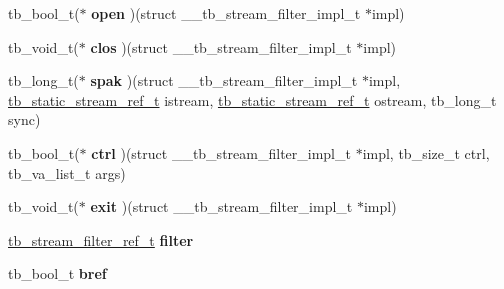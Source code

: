 \begin{DoxyCompactItemize}
\item 
\hypertarget{structtb__stream__filter__impl__t_a34126d14efef5a634b870b4b558e9148}{tb\-\_\-bool\-\_\-t($\ast$ {\bfseries open} )(struct \-\_\-\-\_\-tb\-\_\-stream\-\_\-filter\-\_\-impl\-\_\-t $\ast$impl)}\label{structtb__stream__filter__impl__t_a34126d14efef5a634b870b4b558e9148}

\item 
\hypertarget{structtb__stream__filter__impl__t_a291ebabbf406142133bd3030c4bd5521}{tb\-\_\-void\-\_\-t($\ast$ {\bfseries clos} )(struct \-\_\-\-\_\-tb\-\_\-stream\-\_\-filter\-\_\-impl\-\_\-t $\ast$impl)}\label{structtb__stream__filter__impl__t_a291ebabbf406142133bd3030c4bd5521}

\item 
\hypertarget{structtb__stream__filter__impl__t_a147adaedf1b51d9bc2f5eed1e52ae001}{tb\-\_\-long\-\_\-t($\ast$ {\bfseries spak} )(struct \-\_\-\-\_\-tb\-\_\-stream\-\_\-filter\-\_\-impl\-\_\-t $\ast$impl, \hyperlink{static__stream_8h_a6f19ed215d23e2708f134474b87d281a}{tb\-\_\-static\-\_\-stream\-\_\-ref\-\_\-t} istream, \hyperlink{static__stream_8h_a6f19ed215d23e2708f134474b87d281a}{tb\-\_\-static\-\_\-stream\-\_\-ref\-\_\-t} ostream, tb\-\_\-long\-\_\-t sync)}\label{structtb__stream__filter__impl__t_a147adaedf1b51d9bc2f5eed1e52ae001}

\item 
\hypertarget{structtb__stream__filter__impl__t_a9e67f6392c8bbe7594dc18daac2be254}{tb\-\_\-bool\-\_\-t($\ast$ {\bfseries ctrl} )(struct \-\_\-\-\_\-tb\-\_\-stream\-\_\-filter\-\_\-impl\-\_\-t $\ast$impl, tb\-\_\-size\-\_\-t ctrl, tb\-\_\-va\-\_\-list\-\_\-t args)}\label{structtb__stream__filter__impl__t_a9e67f6392c8bbe7594dc18daac2be254}

\item 
\hypertarget{structtb__stream__filter__impl__t_adc0bd151edd078d5e11e113940d50418}{tb\-\_\-void\-\_\-t($\ast$ {\bfseries exit} )(struct \-\_\-\-\_\-tb\-\_\-stream\-\_\-filter\-\_\-impl\-\_\-t $\ast$impl)}\label{structtb__stream__filter__impl__t_adc0bd151edd078d5e11e113940d50418}

\item 
\hypertarget{structtb__stream__filter__impl__t_aed598038d3b4f0fd54d9ed2e62c5e977}{\hyperlink{structtb__stream__filter__ref__t}{tb\-\_\-stream\-\_\-filter\-\_\-ref\-\_\-t} {\bfseries filter}}\label{structtb__stream__filter__impl__t_aed598038d3b4f0fd54d9ed2e62c5e977}

\item 
\hypertarget{structtb__stream__filter__impl__t_a9d11d2e64c52b9f1bef6b53df76d830b}{tb\-\_\-bool\-\_\-t {\bfseries bref}}\label{structtb__stream__filter__impl__t_a9d11d2e64c52b9f1bef6b53df76d830b}


\end{DoxyCompactItemize}

